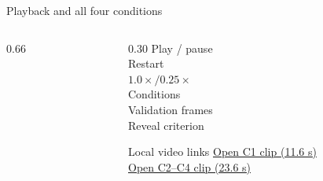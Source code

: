 \begin{frame}{Playback and all four conditions}
\begin{columns}[c,onlytextwidth]
\begin{column}{0.66\textwidth}
\par\par{}
\end{column}
\begin{column}{0.30\textwidth}
\small
{} Play / pause\\[6pt] Restart\\[6pt]
 $1.0\times / 0.25\times$\\[6pt] Conditions\\[6pt]
 Validation frames\\[6pt] Reveal criterion
\par\medskip
\begin{tbox}{Local video links}\footnotesize
\href{run:C1VIDEO.mp4}{Open C1 clip (11.6 s)}\\[6pt]
\href{run:C2,3,4VIDEO.mp4}{Open C2--C4 clip (23.6 s)}
\end{tbox}
\end{column}
\end{columns}
\end{frame}

